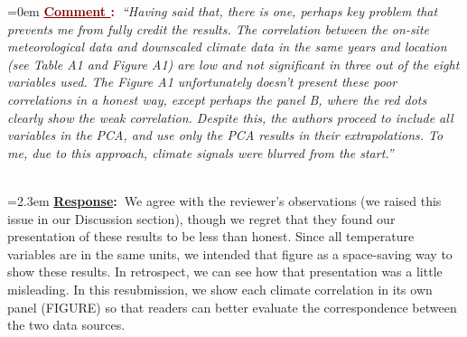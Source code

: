 \documentclass[12pt]{article}
\newcounter{cN}
\newcommand{\comment}[1]{
	\vspace{2em}
	\refstepcounter{cN} %
	\noindent \hangindent=0em \textbf{\textcolor{Maroon}{\uline{Comment \thecN}:~}}\emph{``#1''}
	}
\newcommand{\response}[1]{
	\\[0.25em]
	\hangindent=2.3em \textbf{\textcolor{NavyBlue}{\uline{Response}:~}}#1
	}
\begin{document}
\comment{Having said that, there is one, perhaps key problem that prevents me from fully credit the results. 
The correlation between the on-site meteorological data and downscaled climate data in the same years and location (see Table A1 and Figure A1) are low and not significant in three out of the eight variables used. 
The Figure A1 unfortunately doesn't present these poor correlations in a honest way, except perhaps the panel B, where the red dots clearly show the weak correlation. Despite this, the authors proceed to include all variables in the PCA, and use only the PCA results in their extrapolations. 
To me, due to this approach, climate signals were blurred from the start.}
\response{We agree with the reviewer's observations (we raised this issue in our Discussion section), though we regret that they found our presentation of these results to be less than honest.
Since all temperature variables are in the same units, we intended that figure as a space-saving way to show these results.
In retrospect, we can see how that presentation was a little misleading. 
In this resubmission, we show each climate correlation in its own panel (FIGURE) so that readers can better evaluate the correspondence between the two data sources. }
\end{document}
